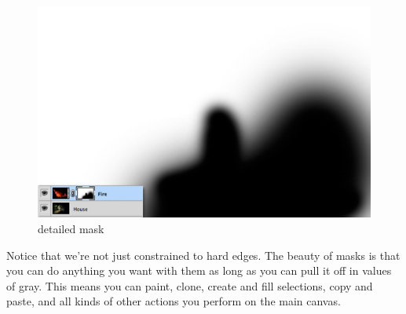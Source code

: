 \begin{figure}
\centering
\includegraphics[width=0.7\linewidth]{Photos/masking_details}
\caption{detailed mask}
\label{fig:masking_details}
\end{figure}

Notice that we’re not just constrained to hard edges. The beauty of masks is that you can do anything you want with them as long as you can pull it off in values of gray. This means you can paint, clone, create and fill selections, copy and paste, and all kinds of other actions you perform on the main canvas.